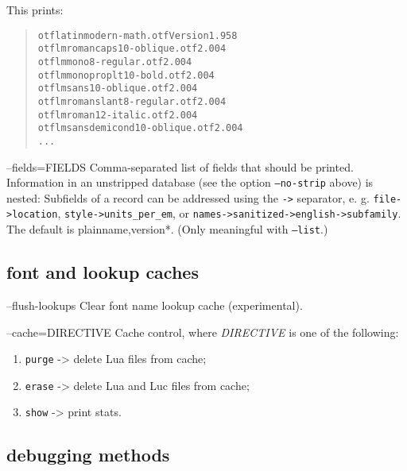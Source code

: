 \documentclass[a4paper]{article}
\providecommand*{\DUoptionlistlabel}[1]{\bf #1 \hfill}
\newenvironment{DUoptionlist}{%
    \list{}{\setlength{\labelwidth}{\DUoptionlistindent}
            \setlength{\rightmargin}{1cm}
            \setlength{\leftmargin}{\rightmargin}
            \addtolength{\leftmargin}{\labelwidth}
            \addtolength{\leftmargin}{\labelsep}
            \renewcommand{\makelabel}{\DUoptionlistlabel}}
  }
  {\endlist}
\begin{document}
\begin{DUoptionlist}
This prints:

\begin{quote}
\begin{alltt}
otf latinmodern-math.otf  Version 1.958
otf lmromancaps10-oblique.otf 2.004
otf lmmono8-regular.otf 2.004
otf lmmonoproplt10-bold.otf 2.004
otf lmsans10-oblique.otf  2.004
otf lmromanslant8-regular.otf 2.004
otf lmroman12-italic.otf  2.004
otf lmsansdemicond10-oblique.otf  2.004
...
\end{alltt}
\end{quote}

\item[--fields=FIELDS]  Comma-separated list of fields that should be
printed.
Information in an unstripped database (see the
option \texttt{--no-strip} above) is nested:
Subfields of a record can be addressed using
the \texttt{->} separator, e. g.
\texttt{file->location}, \texttt{style->units\_per\_em},
or \texttt{names->sanitized->english->subfamily}.
The default is plainname,version*.
(Only meaningful with \texttt{--list}.)
\end{DUoptionlist}


\subsection{font and lookup caches%
  \label{font-and-lookup-caches}%
}

\begin{DUoptionlist}
\item[--flush-lookups]  Clear font name lookup cache (experimental).

\item[--cache=DIRECTIVE]  Cache control, where \emph{DIRECTIVE} is one of the
following:

\begin{enumerate}
\renewcommand{\labelenumi}{\arabic{enumi})}
\item \texttt{purge} -> delete Lua files from cache;

\item \texttt{erase} -> delete Lua and Luc files from
cache;

\item \texttt{show}  -> print stats.
\end{enumerate}
\end{DUoptionlist}


\subsection{debugging methods%
  \label{debugging-methods}%
}
\end{document}
